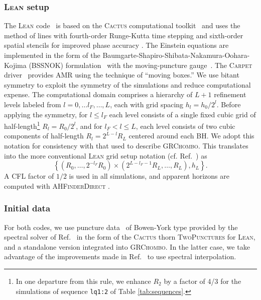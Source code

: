 \documentclass[floats,floatfix,showpacs,amssymb,physrev,twocolumn,superscriptaddress,reprint,
nofootinbib, longbibliography]{revtex4-2}
\begin{document}
\subsubsection{\textsc{Lean} setup}
\label{sec:lean}
The \textsc{Lean} code~\cite{Sperhake:2006cy} is based on the 
\textsc{Cactus} computational toolkit~\cite{Goodale2002a} and uses 
the method of lines with fourth-order Runge-Kutta time stepping and 
sixth-order spatial stencils for improved phase accuracy 
\cite{Husa:2007hp}. The Einstein equations are implemented in the form 
of the Baumgarte-Shapiro-Shibata-Nakamura-Oohara-Kojima (BSSNOK) 
formulation~\cite{Nakamura:1987zz,Shibata:1995we,Baumgarte:1998te} 
with the moving-puncture gauge~\cite{Campanelli:2005dd,Baker:2005vv}. 
The \textsc{Carpet} driver~\cite{Schnetter:2003rb} provides AMR using 
the technique of ``moving boxes.'' We use bitant symmetry to exploit 
the symmetry of the simulations and reduce computational expense. 
The computational domain 
comprises a hierarchy of $L+1$ refinement levels labeled from 
$l=0,\ldots l_F,\ldots,L$, each with grid spacing $h_l=h_0/2^l$. 
Before applying the symmetry, for $l\leq l_F$ each level consists of 
a single fixed cubic grid of half-length\footnote{In one departure from
this rule, we enhance $R_2$ by a factor of 4/3 for the simulations
of sequence \texttt{lq1:2} of Table \ref{tab:sequences}.}
$R_l=R_0/2^l$, and for 
$l_F<l\leq L$, each level consists of two cubic components of 
half-length $R_l=2^{L-l}R_L$ centered around each BH. We adopt this 
notation for consistency with that used to describe \textsc{GRChombo}. 
This translates into the more conventional \textsc{Lean} grid setup 
notation (cf. Ref.~\cite{Sperhake:2006cy}) as
\begin{equation}
    \left\{(R_0,\ldots,2^{-l_F}R_0) \times 
    (2^{L-l_F-1}R_L,\ldots,R_L),h_L\right\}.
\end{equation}
A CFL factor of $1/2$ is used in all simulations, and apparent horizons 
are computed with \textsc{AHFinderDirect}
\cite{Thornburg:1995cp,Thornburg:2003sf}.

\subsubsection{Initial data}
For both codes, we use puncture data~\cite{Brandt:1997tf} of
Bowen-York \cite{Bowen:1980yu} type provided by the spectral solver of
Ref.~\cite{Ansorg:2004ds} in the form of the \textsc{Cactus} thorn
\textsc{TwoPunctures} for \textsc{Lean}, and a standalone version
integrated into \textsc{GRChombo}.  In the latter case, we take
advantage of the improvements made in Ref.~\cite{Paschalidis:2013oya}
to use spectral interpolation.
\end{document}
